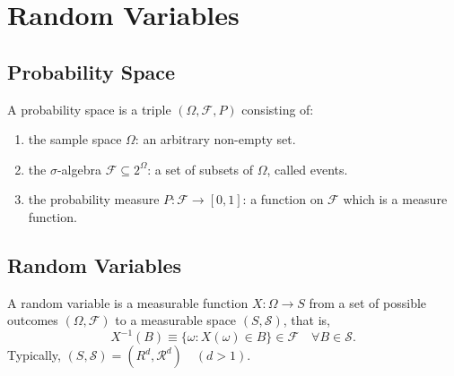 \chapter{Random Variables}


\section{Probability Space}

\begin{definition}
    A probability space is a triple $(\Omega,\mathcal{F},P)$ consisting of:
    \begin{enumerate}
        \item the sample space $\Omega$: an arbitrary non-empty set.
        \item the $\sigma$-algebra $\mathcal{F}\subseteq 2^{\Omega}$: a set of subsets of $\Omega$, called events.
        \item the probability measure $P:\mathcal{F} \rightarrow[0,1]$: a function on $\mathcal{F}$ which is a measure function.
    \end{enumerate}
\end{definition}

\section{Random Variables}

\begin{definition}
    A random variable is a measurable function $X:\Omega\rightarrow S$ from a set of possible outcomes $(\Omega,\mathcal{F})$ to a measurable space $(S,\mathcal{S})$, that is,
    \begin{equation}
        X^{-1}(B)\equiv\{\omega:X(\omega)\in B\}\in\mathcal{F}\quad \forall B\in\mathcal{S}.
    \end{equation}
    Typically, $(S,\mathcal{S})=(R^d,\mathcal{R}^d)\quad(d>1)$.
\end{definition}

